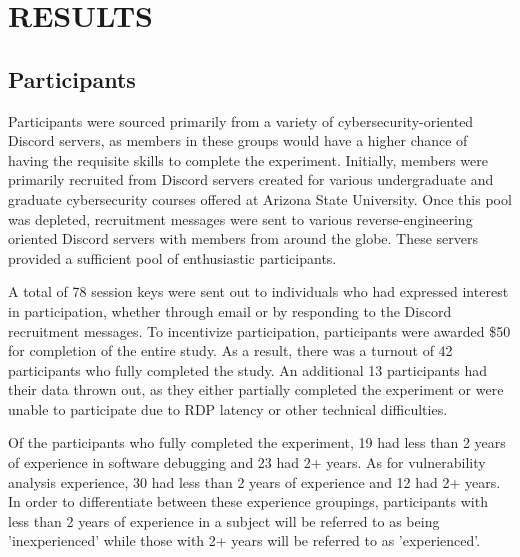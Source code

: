 \newcommand{\totalkeys}{78}
\newcommand{\usableparticipants}{42}
\newcommand{\scrappedparticipants}{13}
\newcommand{\expcount}{21}
\newcommand{\ctlcount}{21}

\newcommand{\inexpdebug}{19}
\newcommand{\expdebug}{23}
\newcommand{\inexpvuln}{30}
\newcommand{\expvuln}{12}


\newcommand{\expmediancorrect}{5}
    \newcommand{\inexperiencedexpmediancorrect}{1}
    \newcommand{\experiencedexpmediancorrect}{4}
\newcommand{\expfollowcorrect}{14}
    \newcommand{\inexperiencedexpfollowcorrect}{7}
    \newcommand{\experiencedexpfollowcorrect}{7}
\newcommand{\expnotescorrect}{14}
    \newcommand{\inexperiencedexpnotescorrect}{6}
    \newcommand{\experiencedexpnotescorrect}{8}
\newcommand{\ctlmediancorrect}{7}
\newcommand{\ctlfollowcorrect}{7}
\newcommand{\ctlnotescorrect}{11}


\chapter{RESULTS}
\section{Participants}
Participants were sourced primarily from a variety of cybersecurity-oriented Discord servers, as members in these groups would have a higher chance of having the requisite skills to complete the experiment. Initially, members were primarily recruited from Discord servers created for various undergraduate and graduate cybersecurity courses offered at Arizona State University. Once this pool was depleted, recruitment messages were sent to various reverse-engineering oriented Discord servers with members from around the globe. These servers provided a sufficient pool of enthusiastic participants.

A total of \totalkeys{} session keys were sent out to individuals who had expressed interest in participation, whether through email or by responding to the Discord recruitment messages. To incentivize participation, participants were awarded \$50 for completion of the entire study. As a result, there was a turnout of \usableparticipants{} participants who fully completed the study. An additional \scrappedparticipants{} participants had their data thrown out, as they either partially completed the experiment or were unable to participate due to RDP latency or other technical difficulties.

Of the participants who fully completed the experiment, \inexpdebug{} had less than 2 years of experience in software debugging and \expdebug{} had 2+ years. As for vulnerability analysis experience, \inexpvuln{} had less than 2 years of experience and \expvuln{} had 2+ years. In order to differentiate between these experience groupings, participants with less than 2 years of experience in a subject will be referred to as being 'inexperienced' while those with 2+ years will be referred to as 'experienced'.


